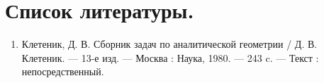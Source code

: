 \documentclass{article}
\theoremstyle{plain}
\begin{document}
\section{Список литературы.}
\begin{enumerate}
    \item Клетеник, Д. В. Сборник задач по аналитической геометрии / Д. В. Клетеник. — 13-е изд. — Москва : Наука, 1980. — 243 c. — Текст : непосредственный.
\end{enumerate}
\end{document}
